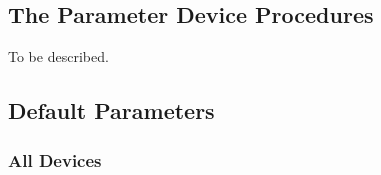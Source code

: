 \documentclass[twoside,a4paper]{article}
\begin{document}


\subsection{The Parameter Device Procedures}

To be described.	%


\subsection{Default Parameters}

\subsubsection{All Devices}
\end{document}
